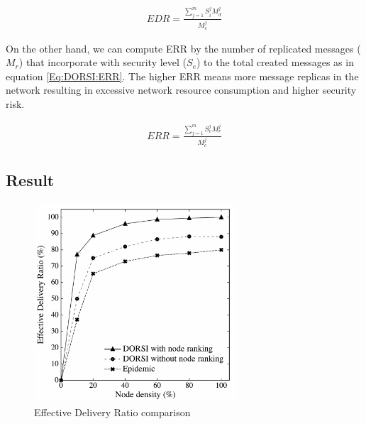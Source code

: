 \begin{eqnarray}
\label{Eq:DORSI:EDR}
EDR=\frac { \sum _{ j=1 }^{ m }{ { S }_{ i }^{ j }{ M }_{ d }^{ j } }  }{ { M }_{ c }^{ j } } 
\end{eqnarray}

On the other hand, we can compute ERR by the number of replicated messages ($M_r$) that incorporate with security level ($S_e$) to the total created messages as in equation \ref{Eq:DORSI:ERR}. 
The higher ERR means more message replicas in the network resulting in excessive network resource consumption and higher security risk.

\begin{eqnarray}
\label{Eq:DORSI:ERR}
ERR=\frac { \sum _{ j=1 }^{ m }{ { S }_{ e }^{ j }{ M }_{ r }^{ j } }  }{ { M }_{ c }^{ j } } 
\end{eqnarray}


\subsection{Result}

\begin{figure}[!h]
\centering
\includegraphics[width=3in]{Graphs/EDR_NodeDensity.pdf}
\caption{Effective Delivery Ratio comparison}
\label{Fig:DORSI:Effective Delivery Ratio comparison}
\end{figure}

